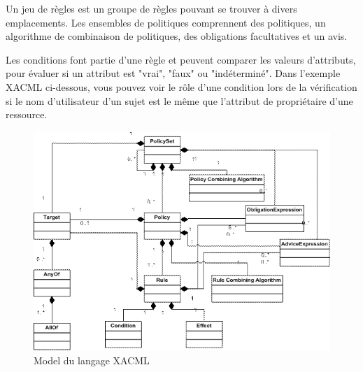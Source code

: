 \label{sectionEnsemble}

Un jeu de règles est un groupe de règles pouvant se trouver à divers emplacements. Les ensembles de politiques comprennent des politiques, un algorithme de combinaison de politiques, des obligations facultatives et un avis.

\label{sectionCondition}

Les conditions font partie d'une règle et peuvent comparer les valeurs d'attributs, pour évaluer si un attribut est "vrai", "faux" ou "indéterminé". Dans l'exemple XACML ci-dessous, vous pouvez voir le rôle d'une condition lors de la vérification si le nom d'utilisateur d'un sujet est le même que l'attribut de propriétaire d'une ressource.

\begin{figure}[h!]
    \centering
		\includegraphics[scale=4.9]{chap4/images/model.png}
    \caption{Model du langage XACML \cite{standard13}}
	 \label{figflux}
\end{figure} 

\label{sectionAvantageXACML}

